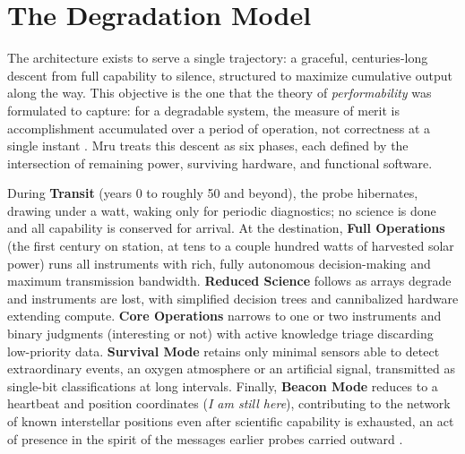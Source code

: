 \documentclass[10pt, a4paper]{article}
\begin{document}
\section{The Degradation Model}

The architecture exists to serve a single trajectory: a graceful, centuries-long descent from full capability to silence, structured to maximize cumulative output along the way. This objective is the one that the theory of \textit{performability} was formulated to capture: for a degradable system, the measure of merit is accomplishment accumulated over a period of operation, not correctness at a single instant \cite{meyer1980}. Mru treats this descent as six phases, each defined by the intersection of remaining power, surviving hardware, and functional software.

During \textbf{Transit} (years 0 to roughly 50 and beyond), the probe hibernates, drawing under a watt, waking only for periodic diagnostics; no science is done and all capability is conserved for arrival. At the destination, \textbf{Full Operations} (the first century on station, at tens to a couple hundred watts of harvested solar power) runs all instruments with rich, fully autonomous decision-making and maximum transmission bandwidth. \textbf{Reduced Science} follows as arrays degrade and instruments are lost, with simplified decision trees and cannibalized hardware extending compute. \textbf{Core Operations} narrows to one or two instruments and binary judgments (interesting or not) with active knowledge triage discarding low-priority data. \textbf{Survival Mode} retains only minimal sensors able to detect extraordinary events, an oxygen atmosphere or an artificial signal, transmitted as single-bit classifications at long intervals. Finally, \textbf{Beacon Mode} reduces to a heartbeat and position coordinates (\textit{I am still here}), contributing to the network of known interstellar positions even after scientific capability is exhausted, an act of presence in the spirit of the messages earlier probes carried outward \cite{sagan1972}.
\end{document}
